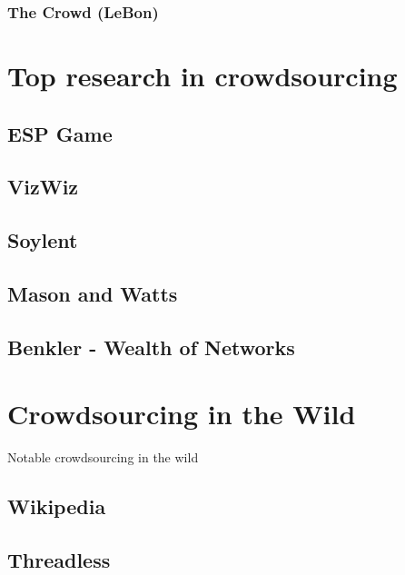 \subsubsection{The Crowd (LeBon)}\label{the-crowd-lebon}

\section{Top research in
crowdsourcing}\label{top-research-in-crowdsourcing}

\subsection{ESP Game}\label{esp-game}

\subsection{VizWiz}\label{vizwiz}

\subsection{Soylent}\label{soylent}

\subsection{Mason and Watts}\label{mason-and-watts}

\subsection{Benkler - Wealth of
Networks}\label{benkler---wealth-of-networks}

\section{Crowdsourcing in the Wild}\label{crowdsourcing-in-the-wild}

Notable crowdsourcing in the wild

\subsection{Wikipedia}\label{wikipedia}

\subsection{Threadless}\label{threadless}

